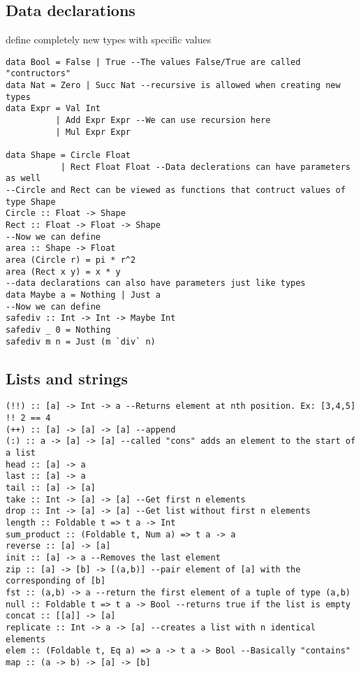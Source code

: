 \documentclass[12pt]{article}
\begin{document}
\subsection*{Data declarations}
define completely new types with specific values
\begin{verbatim}
data Bool = False | True --The values False/True are called "contructors"
data Nat = Zero | Succ Nat --recursive is allowed when creating new types
data Expr = Val Int 
          | Add Expr Expr --We can use recursion here
          | Mul Expr Expr

data Shape = Circle Float
           | Rect Float Float --Data declerations can have parameters as well
--Circle and Rect can be viewed as functions that contruct values of type Shape
Circle :: Float -> Shape
Rect :: Float -> Float -> Shape
--Now we can define
area :: Shape -> Float
area (Circle r) = pi * r^2
area (Rect x y) = x * y
--data declarations can also have parameters just like types
data Maybe a = Nothing | Just a
--Now we can define
safediv :: Int -> Int -> Maybe Int
safediv _ 0 = Nothing
safediv m n = Just (m `div` n)
\end{verbatim}



\subsection*{Lists and strings}
\begin{verbatim}
(!!) :: [a] -> Int -> a --Returns element at nth position. Ex: [3,4,5] !! 2 == 4
(++) :: [a] -> [a] -> [a] --append
(:) :: a -> [a] -> [a] --called "cons" adds an element to the start of a list
head :: [a] -> a
last :: [a] -> a
tail :: [a] -> [a]
take :: Int -> [a] -> [a] --Get first n elements
drop :: Int -> [a] -> [a] --Get list without first n elements
length :: Foldable t => t a -> Int
sum_product :: (Foldable t, Num a) => t a -> a
reverse :: [a] -> [a]
init :: [a] -> a --Removes the last element
zip :: [a] -> [b] -> [(a,b)] --pair element of [a] with the corresponding of [b]
fst :: (a,b) -> a --return the first element of a tuple of type (a,b)
null :: Foldable t => t a -> Bool --returns true if the list is empty
concat :: [[a]] -> [a]
replicate :: Int -> a -> [a] --creates a list with n identical elements
elem :: (Foldable t, Eq a) => a -> t a -> Bool --Basically "contains" 
map :: (a -> b) -> [a] -> [b]
\end{verbatim}
\end{document}
